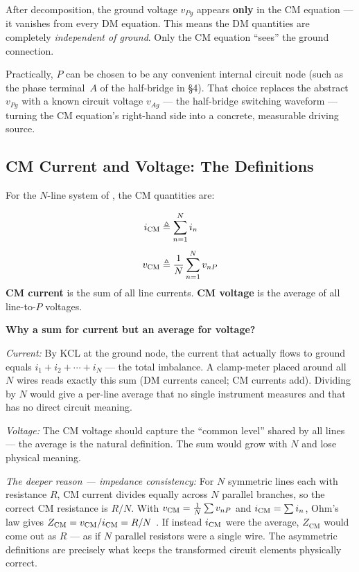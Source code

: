 \begin{physbox}
After decomposition, the ground voltage $v_{Pg}$ appears
\textbf{only} in the CM equation — it vanishes from every DM
equation.  This means the DM quantities are completely
\emph{independent of ground}.  Only the CM equation ``sees'' the
ground connection.

Practically, $P$ can be chosen to be any convenient internal circuit
node (such as the phase terminal~$A$ of the half-bridge in \S4).
That choice replaces the abstract $v_{Pg}$ with a known circuit
voltage $v_{Ag}$ — the half-bridge switching waveform — turning
the CM equation's right-hand side into a concrete, measurable
driving source.
\end{physbox}

\subsection{CM Current and Voltage: The Definitions}

For the $N$-line system of , the CM quantities are:

\begin{eqnbox}
\begin{align}
    i_{\mathrm{CM}}  &\triangleq \sum_{n=1}^{N} i_n
           \label{eq:icm} \\[4pt]
    v_{\mathrm{CM}}  &\triangleq \frac{1}{N} \sum_{n=1}^{N} v_{nP}
           \label{eq:vcm}
\end{align}
\textbf{CM current} is the sum of all line currents.
\textbf{CM voltage} is the average of all line-to-$P$ voltages.

\medskip
\textbf{Why a sum for current but an average for voltage?}

\textit{Current:} By KCL at the ground node, the current that
actually flows to ground equals $i_1 + i_2 + \cdots + i_N$ — the
total imbalance.  A clamp-meter placed around all $N$ wires reads
exactly this sum (DM currents cancel; CM currents add).  Dividing
by $N$ would give a per-line average that no single instrument
measures and that has no direct circuit meaning.

\textit{Voltage:} The CM voltage should capture the
``common level'' shared by all lines — the average is the natural
definition.  The sum would grow with $N$ and lose physical meaning.

\textit{The deeper reason — impedance consistency:}  For $N$
symmetric lines each with resistance $R$, CM current divides
equally across $N$ parallel branches, so the correct CM resistance
is $R/N$.  With $v_{\mathrm{CM}} = \frac{1}{N}\sum v_{nP}$ and
$i_{\mathrm{CM}} = \sum i_n$, Ohm's law gives
$Z_{\mathrm{CM}} = v_{\mathrm{CM}}/i_{\mathrm{CM}} = R/N$ \checkmark.
If instead $i_{\mathrm{CM}}$ were the average, $Z_{\mathrm{CM}}$ would
come out as $R$ — as if $N$ parallel resistors were a single wire.
The asymmetric definitions are precisely what keeps the transformed
circuit elements physically correct.
\end{eqnbox}

